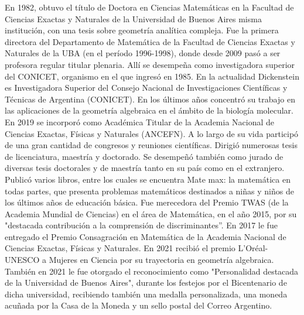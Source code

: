 \begin{parchment}{En 1982, obtuvo el título de Doctora en Ciencias Matemáticas en la Facultad de Ciencias Exactas y Naturales de la Universidad de Buenos Aires misma institución, con una tesis sobre geometría analítica compleja.
Fue la primera directora del Departamento de Matemática de la Facultad de Ciencias Exactas y Naturales de la UBA (en el período 1996-1998), donde desde 2009 pasó a ser profesora regular titular plenaria. Allí se desempeña como investigadora superior del CONICET, organismo en el que ingresó en 1985.
En la actualidad Dickenstein es Investigadora Superior del Consejo Nacional de Investigaciones Científicas y Técnicas de Argentina (CONICET). En los últimos años concentró su trabajo en las aplicaciones de la geometría algebraica en el ámbito de la biología molecular.
En 2019 se incorporó como Académica Titular de la Academia Nacional de Ciencias Exactas, Físicas y Naturales (ANCEFN). 
A lo largo de su vida participó de una gran cantidad de congresos y reuniones científicas. Dirigió numerosas tesis de licenciatura, maestría y doctorado. Se desempeñó también como jurado de diversas tesis doctorales y de maestría tanto en su país como en el extranjero.
Publicó varios libros, entre los cuales se encuentra Mate max: la matemática en todas partes, que presenta problemas matemáticos destinados a niñas y niños de los últimos años de educación básica.
Fue merecedora del Premio TWAS (de la Academia Mundial de Ciencias) en el área de Matemática, en el año 2015, por su "destacada contribución a la comprensión de discriminantes”.
En 2017 le fue entregado el Premio Consagración en Matemática de la Academia Nacional de Ciencias Exactas, Físicas y Naturales.
En 2021 recibió el premio L'Oréal-UNESCO a Mujeres en Ciencia por su trayectoria en geometría algebraica.
También en 2021 le fue otorgado el reconocimiento como "Personalidad destacada de la Universidad de Buenos Aires", durante los festejos por el Bicentenario de dicha universidad, recibiendo también una medalla personalizada, una moneda acuñada por la Casa de la Moneda y un sello postal del Correo Argentino.}
\end{parchment}


